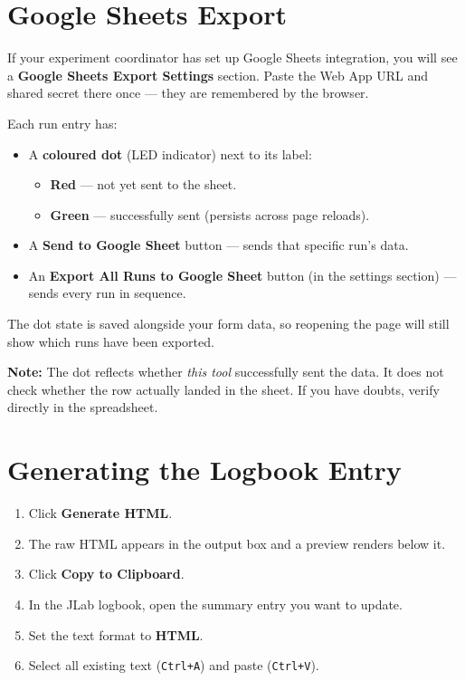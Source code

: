 \chapter{Google Sheets Export}

If your experiment coordinator has set up Google Sheets integration, you will
see a \textbf{Google Sheets Export Settings} section. Paste the Web App URL and
shared secret there once --- they are remembered by the browser.

Each run entry has:

\begin{itemize}
    \item A \textbf{coloured dot} (LED indicator) next to its label:
          \begin{itemize}
              \item \textbf{Red} --- not yet sent to the sheet.
              \item \textbf{Green} --- successfully sent (persists across page
                    reloads).
          \end{itemize}
    \item A \textbf{Send to Google Sheet} button --- sends that specific run's
          data.
    \item An \textbf{Export All Runs to Google Sheet} button (in the settings
          section) --- sends every run in sequence.
\end{itemize}

The dot state is saved alongside your form data, so reopening the page will
still show which runs have been exported.

\begin{notebox}
\textbf{Note:} The dot reflects whether \emph{this tool} successfully sent the
data. It does not check whether the row actually landed in the sheet. If you
have doubts, verify directly in the spreadsheet.
\end{notebox}

\chapter{Generating the Logbook Entry}

\begin{enumerate}
    \item Click \textbf{Generate HTML}.
    \item The raw HTML appears in the output box and a preview renders below it.
    \item Click \textbf{Copy to Clipboard}.
    \item In the JLab logbook, open the summary entry you want to update.
    \item Set the text format to \textbf{HTML}.
    \item Select all existing text (\texttt{Ctrl+A}) and paste (\texttt{Ctrl+V}).
\end{enumerate}

